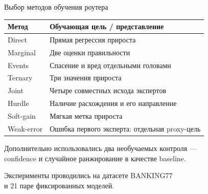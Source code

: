 \documentclass[aspectratio=169,11pt]{beamer}
\begin{document}
\begin{frame}{Выбор методов обучения роутера}
\centering
{\fontsize{10}{12}\selectfont
\renewcommand{\arraystretch}{1.15}
\setlength{\tabcolsep}{6pt}
\begin{tabular}{lp{10.1cm}}
\toprule
Метод & Обучающая цель / представление \\
\midrule
Direct & Прямая регрессия прироста \\
Marginal & Две оценки правильности \\
Events & Спасение и вред отдельными головами \\
Ternary & Три значения прироста \\
Joint & Четыре совместных исхода экспертов \\
Hurdle & Наличие расхождения и его направление \\
Soft-gain & Мягкая метка прироста \\
Weak-error & Ошибка первого эксперта: отдельная proxy-цель \\
\bottomrule
\end{tabular}\par}
\vspace{.28cm}
{\fontsize{10}{13}\selectfont
Дополнительно использовались два необучаемых контроля —\\
confidence и случайное ранжирование в качестве baseline.\par}
\vspace{.20cm}
{\fontsize{9}{11}\selectfont\color{muted}
Эксперименты проводились на датасете BANKING77\\
и 21 паре фиксированных моделей.\par}
\end{frame}
\end{document}
